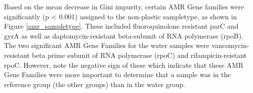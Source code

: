 Based on the mean decrease in Gini impurity, certain AMR Gene families were significantly (p < 0.001) assigned to the non-plastic sampletype, as shown in Figure \ref{amr_sampletype}. These included fluoroquinolone resistant parC and gyrA as well as daptomycin-resistant beta-subunit of RNA polymerase (rpoB). 
The two significant AMR Gene Families for the water samples were vancomycin-resistant beta prime subunit of RNA polymerase (rpoC) and rifampicin-reistant rpoC. 
However, note the negative sign of these which indicate that these AMR Gene Families were more important to determine that a sample was in the reference group (the other groups) than in the water group. 

